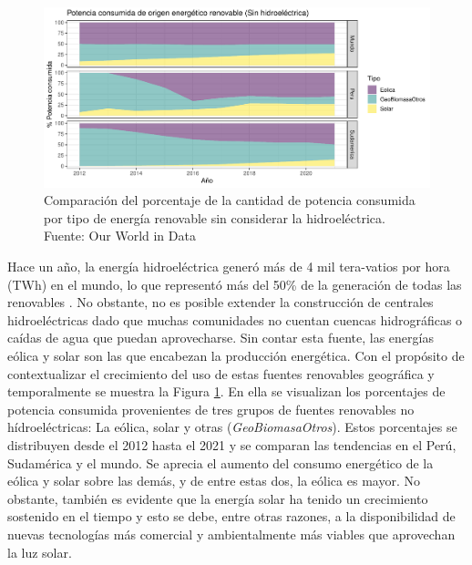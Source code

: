 \begin{figure}[!ht]
    \begin{center}
        \includegraphics[scale=0.7]{img/renovables.pdf}
    \end{center}
    \caption{Comparación del porcentaje de la cantidad de potencia consumida por tipo de energía renovable sin considerar la hidroeléctrica.
    Fuente: Our World in Data \cite{owidenergy}}
    \label{img:PorcentajeRenovable}
\end{figure}

Hace un año, la energía hidroeléctrica generó más de 4 mil tera-vatios por hora (TWh) en el mundo, lo que representó más del 50\% de la generación de todas las renovables \cite{irena2022international}. No obstante, no es posible extender la construcción de centrales hidroeléctricas dado que muchas comunidades no cuentan cuencas hidrográficas o caídas de agua que puedan aprovecharse. Sin contar esta fuente, las energías eólica y solar son las que encabezan la producción energética. Con el propósito de contextualizar el crecimiento del uso de estas fuentes renovables geográfica y temporalmente se muestra la Figura \ref{img:PorcentajeRenovable}. En ella se visualizan los porcentajes de potencia consumida provenientes de tres grupos de fuentes renovables no hídroeléctricas: La eólica, solar y otras (\textit{GeoBiomasaOtros}). Estos porcentajes se distribuyen desde el 2012 hasta el 2021 y se comparan las tendencias en el Perú, Sudamérica y el mundo. Se aprecia el aumento del consumo energético de la eólica y solar sobre las demás, y de entre estas dos, la eólica es mayor. No obstante, también es evidente que la energía solar ha tenido un crecimiento sostenido en el tiempo y esto se debe, entre otras razones, a la disponibilidad de nuevas tecnologías más comercial y ambientalmente más viables que aprovechan la luz solar.



